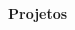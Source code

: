 \noindent\textbf{Projetos}
\noindent\hrulefill
\vspace{0.25em}
\begin{adjustwidth}{1.5em}{0em}
\end{adjustwidth}
\vspace{0.25em}